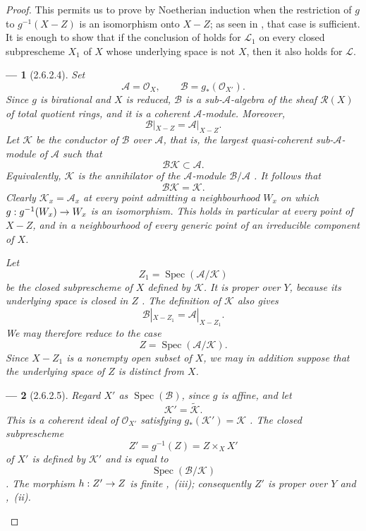 \documentclass[oneside]{amsart}
\theoremstyle{ega-env-style}
\newtheorem*{env}{---}
\theoremstyle{ega-thm-env-style}
\theoremstyle{ega-defn-env-style}
\def\mathcal{\mathscr}
\def\sh{\mathcal}                   %
\def\Spec{\operatorname{Spec}}
\renewcommand{\to}{\mathchoice{\longrightarrow}{\rightarrow}{\rightarrow}{\rightarrow}}
\newcommand{\oldpage}[2][]{{\marginnote{\normalfont{\textbf{#1}~|~#2}}}\ignorespaces}
\let\EGAOriginalLabel\label
\renewcommand{\label}[1]{\phantomsection\EGAOriginalLabel{#1}}
\begin{document}
\begin{proof}
\oldpage[III]{113}

This permits us to prove  by Noetherian induction
 when the restriction of $g$ to $g^{-1}(X-Z)$ is an
isomorphism onto $X-Z$; as seen in , that case is
sufficient.
It is enough to show that if the conclusion of  holds
for $\sh{L}_1$ on every closed subprescheme $X_1$ of $X$ whose
underlying space is not $X$, then it also holds for $\sh{L}$.

\begin{env}[2.6.2.4]
\label{III.2.6.2.4}
Set
\[
  \sh{A}=\sh{O}_X,
  \qquad
  \sh{B}=g_*(\sh{O}_{X'}).
\]
Since $g$ is birational and $X$ is reduced, $\sh{B}$ is a
sub-$\sh{A}$-algebra of the sheaf $\sh{R}(X)$ of total quotient rings,
and it is a coherent $\sh{A}$-module.
Moreover,
\[
  \sh{B}|_{X-Z}=\sh{A}|_{X-Z}.
\]
Let $\sh{K}$ be the conductor of $\sh{B}$ over $\sh{A}$, that is, the
largest quasi-coherent sub-$\sh{A}$-module of $\sh{A}$ such that
\[
  \sh{B}\sh{K}\subset\sh{A}.
\]
Equivalently, $\sh{K}$ is the annihilator of the
$\sh{A}$-module $\sh{B}/\sh{A}$ .
It follows that
\[
  \sh{B}\sh{K}=\sh{K}.
\]
Clearly $\sh{K}_x=\sh{A}_x$ at every point admitting a neighbourhood
$W_x$ on which $g:g^{-1}(W_x)\to W_x$ is an isomorphism.
This holds in particular at every point of $X-Z$, and in a
neighbourhood of every generic point of an irreducible component of
$X$.

Let
\[
  Z_1=\Spec(\sh{A}/\sh{K})
\]
be the closed subprescheme of $X$ defined by $\sh{K}$.
It is proper over $Y$, because its underlying space is closed in $Z$
.
The definition of $\sh{K}$ also gives
\[
  \sh{B}|_{X-Z_1}=\sh{A}|_{X-Z_1}.
\]
We may therefore reduce to the case
\[
  Z=\Spec(\sh{A}/\sh{K}).
\]
Since $X-Z_1$ is a nonempty open subset of $X$, we may in addition
suppose that the underlying space of $Z$ is distinct from $X$.
\end{env}

\begin{env}[2.6.2.5]
\label{III.2.6.2.5}
Regard $X'$ as $\Spec(\sh{B})$, since $g$ is affine, and let
\[
  \sh{K}'=\widetilde{\sh{K}}.
\]
This is a coherent ideal of $\sh{O}_{X'}$ satisfying
$g_*(\sh{K}')=\sh{K}$ .
The closed subprescheme
\[
  Z'=g^{-1}(Z)=Z\times_X X'
\]
of $X'$ is defined by $\sh{K}'$ and is equal to
\[
  \Spec(\sh{B}/\sh{K})
\]
.
The morphism $h:Z'\to Z$ is finite ,~(iii);
consequently $Z'$ is proper over $Y$  and
,~(ii).


\end{env}
\end{proof}
\end{document}
